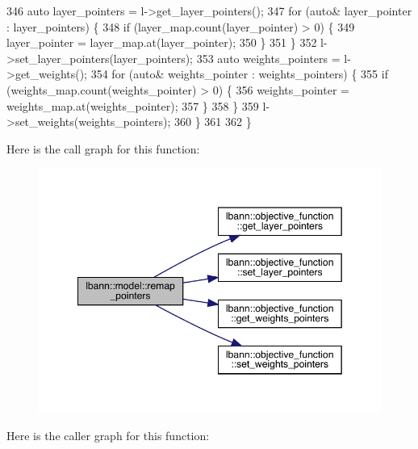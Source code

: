 \begin{DoxyCode}
346     \textcolor{keyword}{auto} layer\_pointers = l->get\_layer\_pointers();
347     \textcolor{keywordflow}{for} (\textcolor{keyword}{auto}& layer\_pointer : layer\_pointers) \{
348       \textcolor{keywordflow}{if} (layer\_map.count(layer\_pointer) > 0) \{
349         layer\_pointer = layer\_map.at(layer\_pointer);
350       \}
351     \}
352     l->set\_layer\_pointers(layer\_pointers);
353     \textcolor{keyword}{auto} weights\_pointers = l->get\_weights();
354     \textcolor{keywordflow}{for} (\textcolor{keyword}{auto}& weights\_pointer : weights\_pointers) \{
355       \textcolor{keywordflow}{if} (weights\_map.count(weights\_pointer) > 0) \{
356         weights\_pointer = weights\_map.at(weights\_pointer);
357       \}
358     \}
359     l->set\_weights(weights\_pointers);
360   \}
361 
362 \}
\end{DoxyCode}
Here is the call graph for this function\+:\nopagebreak
\begin{figure}[H]
\begin{center}
\leavevmode
\includegraphics[width=349pt]{classlbann_1_1model_ac6cc0f5d850cfb997bbbc70eefa0d68f_cgraph}
\end{center}
\end{figure}
Here is the caller graph for this function\+:\nopagebreak
